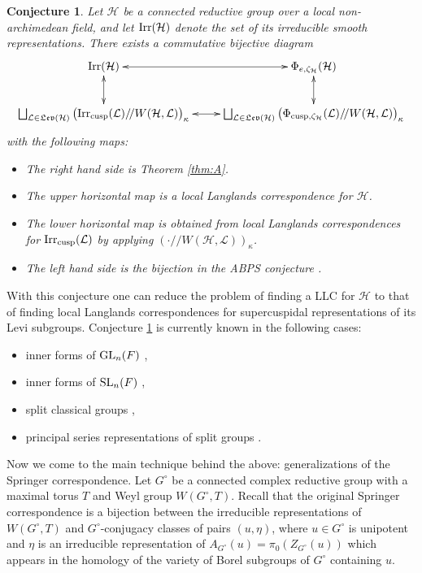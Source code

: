 \documentclass[11pt]{amsart}
\newtheorem{conjintro}[thmintro]{Conjecture}
\theoremstyle{definition}
\newcommand{\mf}{\mathfrak}
\newcommand{\q}{/\!/}
\def\Irr{{\rm Irr}}
\def\GL{{\rm GL}}
\def\SL{{\rm SL}}
\def\cL{{\mathcal L}}
\def\cH{{\mathcal H}}
\def\cusp{{\rm cusp}}
\begin{document}
\begin{conjintro}\label{conj:B}
Let $\cH$ be a connected reductive group over a local non-archimedean field, and 
let $\Irr(\cH)$ denote the set of its irreducible smooth representations.
There exists a commutative bijective diagram
\[
\xymatrix{
\Irr (\cH) \ar@{<->}[r] \ar@{<->}[d] & \Phi_{e,\zeta_\cH} (\cH) \ar@{<->}[d] \\
\bigsqcup_{\cL \in \mf{Lev}(\cH)} \big( \Irr_\cusp (\cL) \q W(\cH,\cL) 
\big)_\kappa \ar@{<->}[r] & \bigsqcup_{\cL \in \mf{Lev}(\cH)} 
\big( \Phi_{\cusp,\zeta_\cH} (\cL) \q W(\cH,\cL) \big)_\kappa
}
\]
with the following maps:
\begin{itemize}
\item The right hand side is Theorem \ref{thm:A}.
\item The upper horizontal map is a local Langlands correspondence for $\cH$.
\item The lower horizontal map is obtained from local Langlands correspondences
for $\Irr_\cusp (\cL)$ by applying $( \cdot \q  W(\cH,\cL) )_\kappa$.
\item The left hand side is the bijection in the ABPS conjecture \cite[\S 2]{ABPS7}.
\end{itemize}
\end{conjintro}

With this conjecture one can reduce the problem of finding a LLC for $\cH$ to that
of finding local Langlands correspondences for supercuspidal representations of its
Levi subgroups. Conjecture \ref{conj:B} is currently known in the following cases:
\begin{itemize}
\item inner forms of $\GL_n (F)$ \cite[Theorem 5.3]{ABPS6},
\item inner forms of $\SL_n (F)$ \cite[Theorem 5.6]{ABPS6},
\item split classical groups \cite[\S 5.3]{Mou},
\item principal series representations of split groups \cite[\S 16]{ABPS5}.\\
\end{itemize}

Now we come to the main technique behind the above: generalizations of the Springer
correspondence. Let $G^\circ$ be a connected complex reductive group with a maximal
torus $T$ and Weyl group $W(G^\circ,T)$. Recall that the original Springer 
correspondence \cite{Spr} is a bijection between the irreducible representations
of $W(G^\circ,T)$ and $G^\circ$-conjugacy classes of pairs $(u,\eta)$, where 
$u \in G^\circ$ is unipotent and $\eta$ is an irreducible representation of 
$A_{G^\circ}(u) = \pi_0 (Z_{G^\circ}(u))$ which appears in the homology of the 
variety of Borel subgroups of $G^\circ$ containing $u$. 
\end{document}
